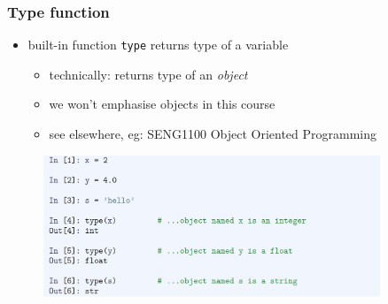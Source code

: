 \documentclass[english,14pt]{beamer}
\newcommand\red[1]{{\color{red} #1}}
\begin{document}
\begin{frame}[fragile]

\frametitle{Type function}

\begin{itemize}
	\item built-in function \texttt{type} returns type of a variable
	\begin{itemize}
		\item technically: returns type of an \red{\emph{object}}
		\item we won't emphasise objects in this course
		\item see elsewhere, eg: SENG1100 Object Oriented Programming
	\end{itemize}
\end{itemize}
\vspace*{-3mm}
\begin{figure}[ht]
	\centering
	\includegraphics[width=0.9\textwidth]{figures/LLp43a}
\end{figure}

\end{frame}

\end{document}
